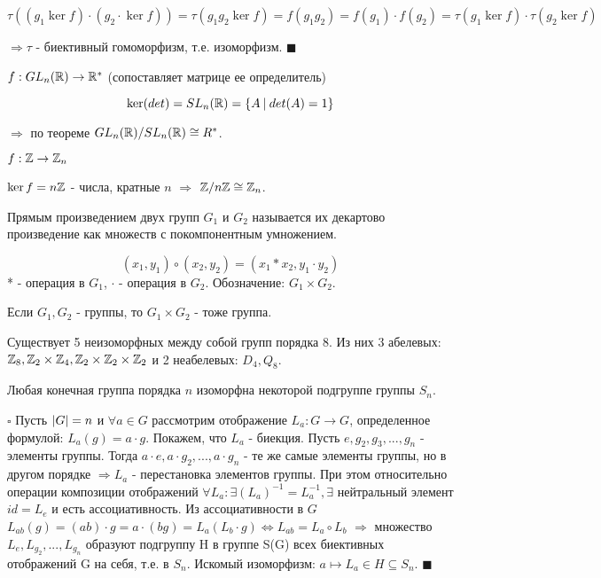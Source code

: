 \documentclass[../main.tex]{subfiles}
\begin{document}
$$\tau((g_1\ker{f})\cdot (g_2\cdot\ker{f})) = \tau(g_1g_2\ker{f}) = f(g_1g_2) = f(g_1)\cdot f(g_2)
= \tau(g_1\ker{f})\cdot \tau(g_2\ker{f})$$

$\Longrightarrow \tau$ - биективный гомоморфизм, т.е. изоморфизм. $\blacksquare$

\void
{}

\void{} $f: GL_n(\mathbb{R}) \rightarrow \mathbb{R}^*$ (сопоставляет матрице ее определитель)

$$\ker(det) = SL_n(\mathbb{R}) = \{A\:\vert\: det(A) = 1\}$$

$\Rightarrow$ по теореме $GL_n(\mathbb{R})/SL_n(\mathbb{R}) \cong R^*$.

\void{} $f: \mathbb{Z} \rightarrow \mathbb{Z}_n$

$\ker{f} = n\mathbb{Z}$ - числа, кратные $n$ $\Longrightarrow$ $\mathbb{Z}/n\mathbb{Z} \cong \mathbb{Z}_n$.

\void
{} Прямым произведением двух групп $G_1$ и $G_2$ называется их декартово
произведение как множеств с покомпонентным умножением.

$$(x_1, y_1) \circ (x_2, y_2) = (x_1 * x_2, y_1 \cdot y_2)$$
* - операция в $G_1$, $\cdot$ - операция в $G_2$.
Обозначение: $G_1\times G_2$.

\void
{} Если $G_1, G_2$ - группы, то $G_1\times G_2$ - тоже группа.

\void
{} Существует 5 неизоморфных между собой групп порядка 8. Из них 3
абелевых: $\mathbb{Z}_8, \mathbb{Z}_2\times\mathbb{Z}_4, \mathbb{Z}_2\times\mathbb{Z}_2\times\mathbb{Z}_2$ и 2 неабелевых: $D_4, Q_8$.

\void
{}

Любая конечная группа порядка $n$ изоморфна некоторой подгруппе группы $S_n$.

\void
$\square$ Пусть $\vert G\vert = n$ и $\forall a\in G$ рассмотрим отображение
$L_a: G\rightarrow G$, определенное формулой: $L_a(g) = a\cdot g$. Покажем, что
$L_a$ - биекция. Пусть $e, g_2, g_3,...,g_n$ - элементы группы. Тогда
$a\cdot e, a\cdot g_2,...,a\cdot g_n$ - те же самые элементы группы, но в
другом порядке $\Longrightarrow L_a$ - перестановка элементов группы.
При этом относительно операции композиции отображений $\forall L_a: \exists (L_a)^{-1} =
L_a^{-1}, \exists$ нейтральный элемент $id = L_e$ и есть ассоциативность. Из ассоциативности
в $G$ $L_{ab}(g) = (ab)\cdot g = a\cdot (bg) = L_a(L_b\cdot g) \Leftrightarrow L_{ab} = L_a\circ L_b$
$\Rightarrow$ множество $L_e, L_{g_2},...,L_{g_n}$ образуют подгруппу H в группе S(G) всех
биективных отображений G на себя, т.е. в $S_n$. Искомый изоморфизм:
$a \mapsto L_a\in H\subseteq S_n$. $\blacksquare$ 
\end{document}
